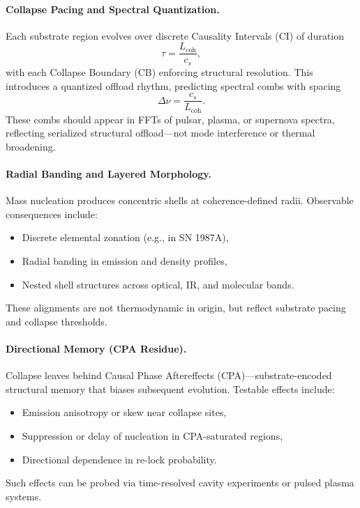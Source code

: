 \documentclass[preprints,article,submit,pdftex,moreauthors]{Definitions/mdpi}
\begin{document}
\paragraph{Collapse Pacing and Spectral Quantization.}
Each substrate region evolves over discrete Causality Intervals (CI) of duration
\[
\tau = \frac{L_{\mathrm{coh}}}{c_s},
\]
with each Collapse Boundary (CB) enforcing structural resolution. This introduces a quantized offload rhythm, predicting spectral combs with spacing
\[
\Delta \nu = \frac{c_s}{L_{\mathrm{coh}}}.
\]
These combs should appear in FFTs of pulsar, plasma, or supernova spectra, reflecting serialized structural offload—not mode interference or thermal broadening.

\paragraph{Radial Banding and Layered Morphology.}
Mass nucleation produces concentric shells at coherence-defined radii. Observable consequences include:
\begin{itemize}
  \item Discrete elemental zonation (e.g., in SN 1987A),
  \item Radial banding in emission and density profiles,
  \item Nested shell structures across optical, IR, and molecular bands.
\end{itemize}
These alignments are not thermodynamic in origin, but reflect substrate pacing and collapse thresholds.

\paragraph{Directional Memory (CPA Residue).}
Collapse leaves behind Causal Phase Aftereffects (CPA)—substrate-encoded structural memory that biases subsequent evolution. Testable effects include:
\begin{itemize}
  \item Emission anisotropy or skew near collapse sites,
  \item Suppression or delay of nucleation in CPA-saturated regions,
  \item Directional dependence in re-lock probability.
\end{itemize}
Such effects can be probed via time-resolved cavity experiments or pulsed plasma systems.
\end{document}
